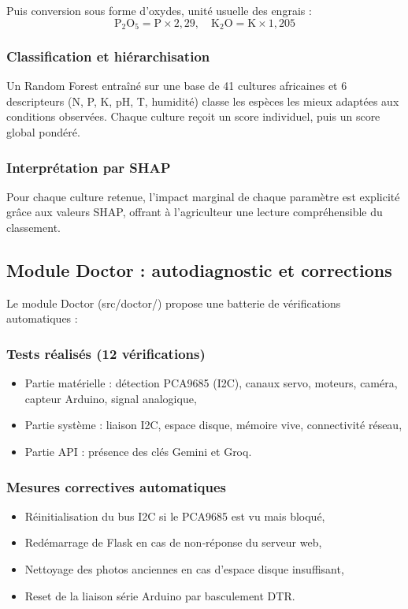 \documentclass[a4paper,12pt,openany,titlepage]{scrartcl}
\begin{document}
Puis conversion sous forme d’oxydes, unité usuelle des engrais :
\begin{equation}
\text{P}_2\text{O}_5 = \text{P} \times 2{,}29, \quad \text{K}_2\text{O} = \text{K} \times 1{,}205
\end{equation}

\subsubsection{Classification et hiérarchisation}
Un Random Forest entraîné sur une base de 41 cultures africaines et 6 descripteurs (N, P, K, pH, T, humidité) classe les espèces les mieux adaptées aux conditions observées. Chaque culture reçoit un score individuel, puis un score global pondéré.

\subsubsection{Interprétation par SHAP}
Pour chaque culture retenue, l’impact marginal de chaque paramètre est explicité grâce aux valeurs SHAP, offrant à l’agriculteur une lecture compréhensible du classement.

\subsection{Module Doctor : autodiagnostic et corrections}

Le module Doctor (src/doctor/) propose une batterie de vérifications automatiques :

\subsubsection{Tests réalisés (12 vérifications)}
\begin{itemize}[nosep]
    \item Partie matérielle : détection PCA9685 (I2C), canaux servo, moteurs, caméra, capteur Arduino, signal analogique,
    \item Partie système : liaison I2C, espace disque, mémoire vive, connectivité réseau,
    \item Partie API : présence des clés Gemini et Groq.
\end{itemize}

\subsubsection{Mesures correctives automatiques}
\begin{itemize}[nosep]
    \item Réinitialisation du bus I2C si le PCA9685 est vu mais bloqué,
    \item Redémarrage de Flask en cas de non‑réponse du serveur web,
    \item Nettoyage des photos anciennes en cas d’espace disque insuffisant,
    \item Reset de la liaison série Arduino par basculement DTR.
\end{itemize}
\end{document}

